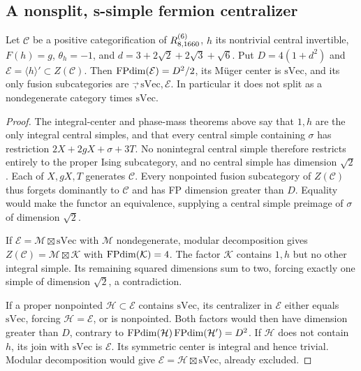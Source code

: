\subsection{A nonsplit, s-simple fermion centralizer}
\begin{proposition}\label{prop:r1660-fermion-centralizer}
Let $\mathcal C$ be a positive categorification of $R^{(6)}_{8,1660}$,
$h$ its nontrivial central invertible, $F(h)=g$, $\theta_h=-1$, and
$d=3+2\sqrt2+2\sqrt3+\sqrt6$. Put $D=4(1+d^2)$ and
$\mathcal E=\langle h\rangle'\subset Z(\mathcal C)$.
Then $\operatorname{FPdim}(\mathcal E)=D^2/2$, its M\"uger center is $\mathrm{sVec}$,
and its only fusion subcategories are $\Vec,\mathrm{sVec},\mathcal E$.
In particular it does not split as a nondegenerate category times
$\mathrm{sVec}$.
\end{proposition}
\begin{proof}
The integral-center and phase-mass theorems above say that $1,h$ are the
only integral central simples, and that every central simple containing
$\sigma$ has restriction $2X+2gX+\sigma+3T$. No nonintegral central simple
therefore restricts entirely to the proper Ising subcategory, and no
central simple has dimension $\sqrt2$. Each of $X,gX,T$ generates
$\mathcal C$. Every nonpointed fusion subcategory of $Z(\mathcal C)$
thus forgets dominantly to $\mathcal C$ and has FP dimension greater
than $D$. Equality would make the functor an equivalence, supplying a
central simple preimage of $\sigma$ of dimension $\sqrt2$.

If $\mathcal E=\mathcal M\boxtimes\mathrm{sVec}$ with $\mathcal M$
nondegenerate, modular decomposition \cite{DGNO,DMNO} gives
$Z(\mathcal C)=\mathcal M\boxtimes\mathcal K$ with
$\operatorname{FPdim}(\mathcal K)=4$. The factor $\mathcal K$ contains $1,h$ but no
other integral simple. Its remaining squared dimensions sum to two,
forcing exactly one simple of dimension $\sqrt2$, a contradiction.

If a proper nonpointed $\mathcal H\subset\mathcal E$ contains
$\mathrm{sVec}$, its centralizer in $\mathcal E$ either equals
$\mathrm{sVec}$, forcing $\mathcal H=\mathcal E$, or is nonpointed.
Both factors would then have dimension greater than $D$, contrary to
$\operatorname{FPdim}(\mathcal H)\operatorname{FPdim}(\mathcal H')=D^2$.
If $\mathcal H$ does not contain $h$, its join with $\mathrm{sVec}$ is
$\mathcal E$. Its symmetric center is integral and hence trivial.
Modular decomposition would give
$\mathcal E=\mathcal H\boxtimes\mathrm{sVec}$, already excluded.
\end{proof}

